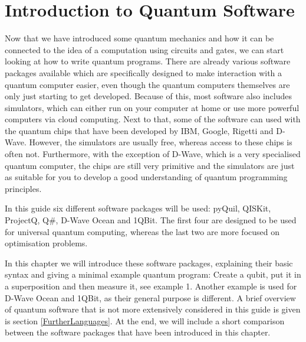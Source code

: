 \chapter{Introduction to Quantum Software}
\label{chpt:quantumsoftware}



Now that we have introduced some quantum mechanics and how it can be connected to the idea of a computation using circuits and gates, we can start looking at how to write quantum programs. There are already various software packages available which are specifically designed to make interaction with a quantum computer easier, even though the quantum computers themselves are only just starting to get developed. Because of this, most software also includes simulators, which can either run on your computer at home or use more powerful computers via cloud computing. Next to that, some of the software can used with the quantum chips that have been developed by IBM, Google, Rigetti and D-Wave. However, the simulators are usually free, whereas access to these chips is often not. Furthermore, with the exception of D-Wave, which is a very specialised quantum computer, the chips are still very primitive and the simulators are just as suitable for you to develop a good understanding of quantum programming principles.

In this guide six different software packages will be used: pyQuil, QISKit, ProjectQ, Q\#, D-Wave Ocean and 1QBit. The first four are designed to be used for universal quantum computing, whereas the last two are more focused on optimisation problems.

In this chapter we will introduce these software packages, explaining their basic syntax and giving a minimal example quantum program: Create a qubit, put it in a superposition and then measure it, see example 1. Another example is used for D-Wave Ocean and 1QBit, as their general purpose is different. A brief overview of quantum software that is not more extensively considered in this guide is given is section \ref{FurtherLanguages}. At the end, we will include a short comparison between the software packages that have been introduced in this chapter.

